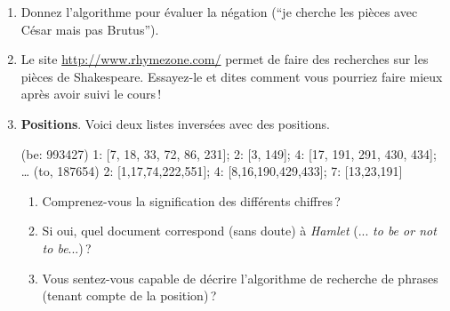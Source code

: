 \documentclass{article}
\newenvironment{smallverbatim}%
{\endgraf\small\verbatimtab}{\endverbatimtab}
\begin{document}
\begin{enumerate}
   Prenons pour commencer l'exemple des listes sur \emph{Brutus} et \emph{César} données
    en cours.
    
    \begin{enumerate}
      \item Combien de comparaisons si les listes ne sont pas triées\,? 
      \item Et si les listes sont triées
    \end{enumerate} 
    
    Maintenant, généralisez. Si la première liste a une taille $n$ et la seconde
    une taille $m$, quel est le coût dans les deux cas\,?
    
    \vspace*{4cm}
    
    \item Donnez l'algorithme pour évaluer la négation (``je cherche les pièces avec César mais pas Brutus'').
    
    
    \vspace*{6cm}
    
  \item Le site   \url{http://www.rhymezone.com/} permet de faire des recherches sur les pièces de Shakespeare. 
     Essayez-le et dites comment vous pourriez faire mieux après avoir suivi le cours\,!
     
    \vspace*{4cm}
    
    \item \textbf{Positions}. Voici deux listes inversées avec des positions.
    
    \begin{smallverbatim}
     (be: 993427) 1: [7, 18, 33, 72, 86, 231]; 2: [3, 149]; 4: [17, 191, 291, 430, 434];  …
     (to, 187654) 2: [1,17,74,222,551]; 4: [8,16,190,429,433]; 7: [13,23,191]
    \end{smallverbatim}
    
    \begin{enumerate}
      \item Comprenez-vous la signification des différents chiffres\,? 
      \item Si oui, quel document correspond
     (sans doute) à \textit{Hamlet} (... \textit{to be or not to be}...)\,?
     \item Vous sentez-vous capable de décrire l'algorithme de recherche de phrases
        (tenant compte de la position)\,?
     \end{enumerate}
     

\end{enumerate}
\end{document}
